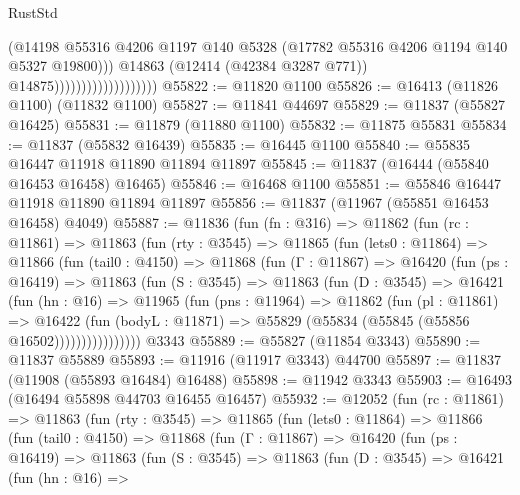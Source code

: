 \begin{lexlean}{RustStd}
\begin{coremodule}
{\begin{coremodule}
{{{{{{{{{{{{{{{{{{{{{{{{{{{{{{{{{{{{{{{{{{{{{{{{{{                                            (@14198
                                              @55316
                                              @4206
                                              @1197
                                              @140
                                              @5328
                                              (@17782 @55316 @4206 @1194 @140 @5327 @19800)))
                                          @14863
                                          (@12414 (@42384 @3287 @771))
                                          @14875)))))))))))))))))))
@55822 := @11820 @1100
@55826 := @16413 (@11826 @1100) (@11832 @1100)
@55827 := @11841 @44697
@55829 := @11837 (@55827 @16425)
@55831 := @11879 (@11880 @1100)
@55832 := @11875 @55831
@55834 := @11837 (@55832 @16439)
@55835 := @16445 @1100
@55840 := @55835 @16447 @11918 @11890 @11894 @11897
@55845 := @11837 (@16444 (@55840 @16453 @16458) @16465)
@55846 := @16468 @1100
@55851 := @55846 @16447 @11918 @11890 @11894 @11897
@55856 := @11837 (@11967 (@55851 @16453 @16458) @4049)
@55887 := @11836
    (fun (fn : @316) =>
    @11862
      (fun (rc : @11861) =>
      @11863
        (fun (rty : @3545) =>
        @11865
          (fun (lets0 : @11864) =>
          @11866
            (fun (tail0 : @4150) =>
            @11868
              (fun (Γ : @11867) =>
              @16420
                (fun (ps : @16419) =>
                @11863
                  (fun (S : @3545) =>
                  @11863
                    (fun (D : @3545) =>
                    @16421
                      (fun (hn : @16) =>
                      @11965
                        (fun (pns : @11964) =>
                        @11862
                          (fun (pl : @11861) =>
                          @16422
                            (fun (bodyL : @11871) =>
                            @55829 (@55834 (@55845 (@55856 @16502))))))))))))))))
    @3343
@55889 := @55827 (@11854 @3343)
@55890 := @11837 @55889
@55893 := @11916 (@11917 @3343) @44700
@55897 := @11837 (@11908 (@55893 @16484) @16488)
@55898 := @11942 @3343
@55903 := @16493 (@16494 @55898 @44703 @16455 @16457)
@55932 := @12052
    (fun (rc : @11861) =>
    @11863
      (fun (rty : @3545) =>
      @11865
        (fun (lets0 : @11864) =>
        @11866
          (fun (tail0 : @4150) =>
          @11868
            (fun (Γ : @11867) =>
            @16420
              (fun (ps : @16419) =>
              @11863
                (fun (S : @3545) =>
                @11863
                  (fun (D : @3545) =>
                  @16421
                    (fun (hn : @16) =>
}}}}}}}}}}}}}}}}}}}}}}}}}}}}}}}}}}}}}}}}}}}}}}}}}}
\end{coremodule}}
\end{coremodule}
\end{lexlean}
